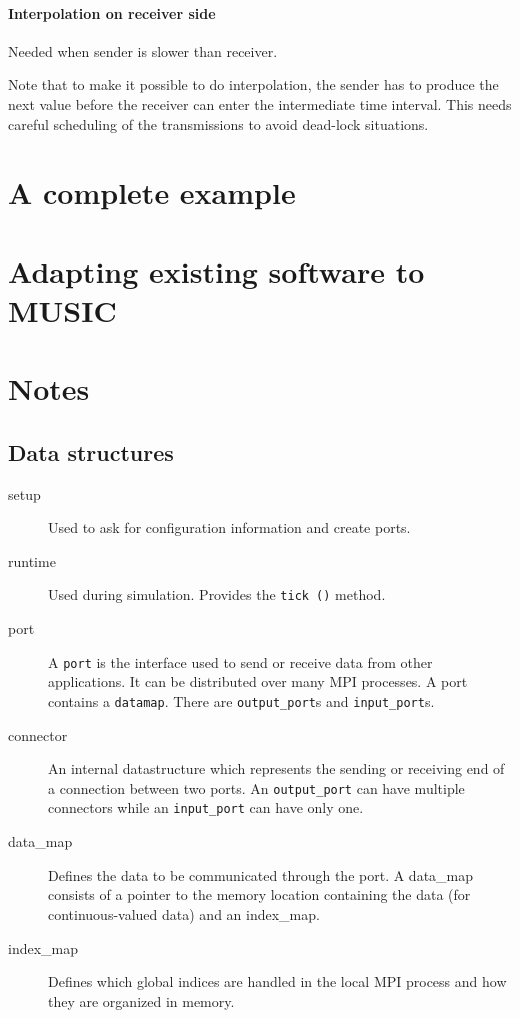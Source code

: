 \documentclass[a4paper]{report}
\begin{document}
\subsubsection{Interpolation on receiver side}

Needed when sender is slower than receiver.

Note that to make it possible to do interpolation, the sender has to
produce the next value before the receiver can enter the intermediate
time interval.  This needs careful scheduling of the transmissions to
avoid dead-lock situations.

\chapter{A complete example}

\chapter{Adapting existing software to MUSIC}

\chapter{Notes}

\section{Data structures}

\begin{description}
  \item[setup] Used to ask for configuration information and create
    ports.
  \item[runtime] Used during simulation.  Provides the \verb|tick ()|
    method.
  \item[port] A \verb|port| is the interface used to send or receive
    data from other applications.  It can be distributed over many MPI
    processes.  A port contains a \verb|datamap|.  There are
    \verb|output_port|s and \verb|input_port|s.
  \item[connector] An internal datastructure which represents the
    sending or receiving end of a connection between two ports.  An
    \verb|output_port| can have multiple connectors while an
    \verb|input_port| can have only one.
  \item[data\_map] Defines the data to be communicated through the
    port.  A data\_map consists of a pointer to the memory location
    containing the data (for continuous-valued data) and an
    index\_map.
  \item[index\_map] Defines which global indices are handled in the
    local MPI process and how they are organized in memory.
\end{description}
\end{document}
